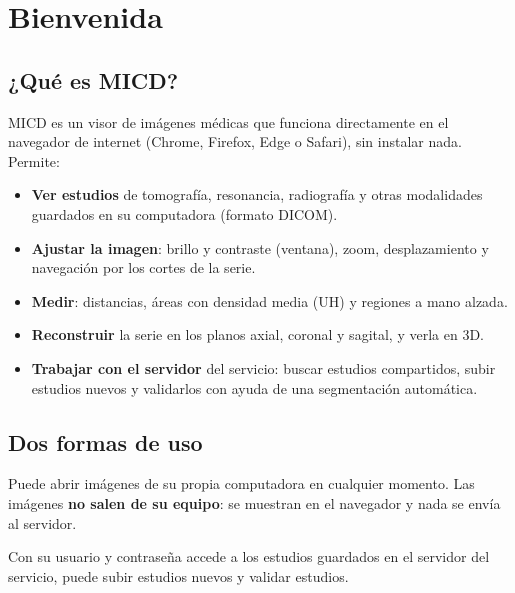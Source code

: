 \documentclass[11pt,a4paper]{report}
\begin{document}
\tableofcontents

\chapter{Bienvenida}

\section{¿Qué es MICD?}

MICD es un visor de imágenes médicas que funciona directamente en el navegador
de internet (Chrome, Firefox, Edge o Safari), sin instalar nada. Permite:

\begin{itemize}
  \item \textbf{Ver estudios} de tomografía, resonancia, radiografía y otras
        modalidades guardados en su computadora (formato DICOM).
  \item \textbf{Ajustar la imagen}: brillo y contraste (ventana), zoom,
        desplazamiento y navegación por los cortes de la serie.
  \item \textbf{Medir}: distancias, áreas con densidad media (UH) y regiones a
        mano alzada.
  \item \textbf{Reconstruir} la serie en los planos axial, coronal y sagital, y
        verla en 3D.
  \item \textbf{Trabajar con el servidor} del servicio: buscar estudios
        compartidos, subir estudios nuevos y validarlos con ayuda de una
        segmentación automática.
\end{itemize}

\section{Dos formas de uso}

\begin{description}[leftmargin=1em,style=nextline]
  \item[Sin iniciar sesión — visor local]
    Puede abrir imágenes de su propia computadora en cualquier momento. Las
    imágenes \textbf{no salen de su equipo}: se muestran en el navegador y nada
    se envía al servidor.
  \item[Con sesión iniciada — servidor]
    Con su usuario y contraseña accede a los estudios guardados en el servidor
    del servicio, puede subir estudios nuevos y validar estudios.
\end{description}
\end{document}
